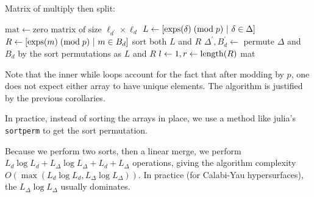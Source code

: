 \begin{algorithm}[H]
\caption{Matrix of multiply then split: \merge}
\label{alg:theta:merge}
$\text{mat} \gets \text{zero matrix of size } \ell_{d^\prime} \times \ell_d $\;
$L \gets [\operatorname{exps}(\delta) \; (\text{mod} \; p) ~|~ \delta \in \Delta]$\;
$R \gets [\operatorname{exps}(m) \; (\text{mod} \; p) ~|~ m \in B_{d}]$\;
sort both  \(L\) and \(R\) \;
\(\Delta^{\prime}, B_{d}^{\prime} \gets \) permute \(\Delta\) and \(B_{d}\) by the sort permutations as \(L\) and \(R\)\;
\(l \gets 1, r \gets \operatorname{length}(R)\)\;
\Return mat
\end{algorithm}

Note that the inner while loops account for the fact that
after modding by \(p\), one does not expect 
either array to have unique elements.
The algorithm is justified by the previous corollaries.

In practice, instead of sorting the arrays in place, 
we use a method like julia's \texttt{sortperm}
to get the sort permutation.

Because we perform two sorts, then a linear merge, 
we perform 
$L_{d} \log L_{d} + L_{\Delta} \log L_{\Delta} + L_{d} + L_{\Delta}$ operations, 
giving the algorithm complexity 
$O(\max(L_{d} \log L_{d}, L_{\Delta} \log L_{\Delta}))$.
In practice (for Calabi-Yau hypersurfaces), 
the $L_{\Delta} \log L_{\Delta}$ usually dominates.

